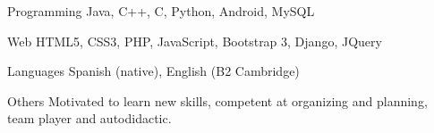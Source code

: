

\begin{cvskills}

  \cvskill
    {Programming} %
    {Java, C++, C, Python, Android, MySQL} %

  \cvskill
    {Web} %
    {HTML5, CSS3, PHP, JavaScript, Bootstrap 3, Django, JQuery} %

  \cvskill
    {Languages} %
    {Spanish (native), English (B2 Cambridge)} %

  \cvskill
    {Others} %
    {Motivated to learn new skills, competent at organizing and planning, team player and autodidactic.} %

\end{cvskills}
